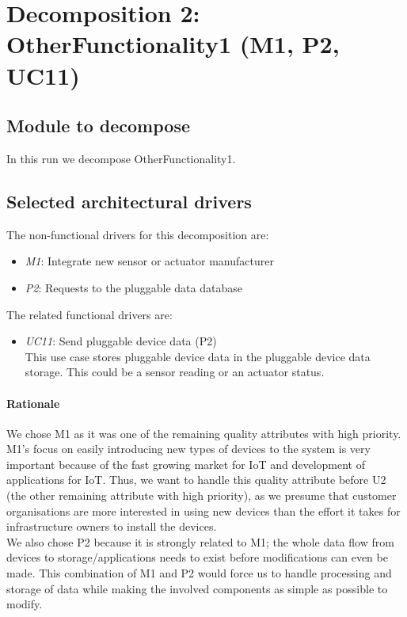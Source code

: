\section{Decomposition 2: OtherFunctionality1 (M1, P2, UC11)}

\subsection{Module to decompose}
    In this run we decompose OtherFunctionality1.


\subsection{Selected architectural drivers}
    The non-functional drivers for this decomposition are:
    \begin{itemize}
    	\item \emph{M1}: Integrate new sensor or actuator manufacturer
        \item \emph{P2}: Requests to the pluggable data database
    \end{itemize}

    The related functional drivers are:
    \begin{itemize}
        \item \emph{UC11}: Send pluggable device data (P2) \\
              This use case stores pluggable device data in the pluggable device data storage.
              This could be a sensor reading or an actuator status.
    \end{itemize}

    \paragraph{Rationale}
    We chose M1 as it was one of the remaining quality attributes with high priority.
    M1's focus on easily introducing new types of devices to the system is very important
    because of the fast growing market for IoT and development of applications for IoT.
    Thus, we want to handle this quality attribute before U2 (the other remaining
    attribute with high priority), as we presume that customer organisations
    are more interested in using new devices than the effort it takes for
    infrastructure owners to install the devices. \\
    We also chose P2 because it is strongly related to M1; the whole data flow from
    devices to storage/applications needs to exist before modifications can even be made.
    This combination of M1 and P2 would force us to handle processing and
    storage of data while making the involved components as simple as possible to modify.


